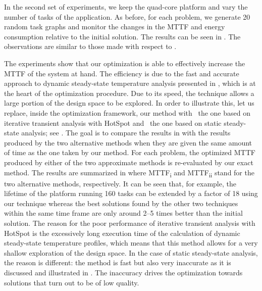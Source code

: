 In the second set of experiments, we keep the quad-core platform and vary the
number of tasks \nt of the application. As before, for each problem, we generate
20 random task graphs and monitor the changes in the \ac{MTTF} and energy
consumption relative to the initial solution. The results can be seen in
. The observations are similar to those made with
respect to .

The experiments show that our optimization is able to effectively increase the
\ac{MTTF} of the system at hand. The efficiency is due to the fast and accurate
approach to dynamic steady-state temperature analysis presented in
, which is at the heart of the optimization
procedure. Due to its speed, the technique allows a large portion of the design
space to be explored. In order to illustrate this, let us replace, inside the
optimization framework, our method with \one~the one based on iterative
transient analysis with HotSpot and \two~the one based on static steady-state
analysis; see . The goal is to compare the
results in  with the results produced by the two
alternative methods when they are given the same amount of time as the one taken
by our method. For each problem, the optimized \ac{MTTF} produced by either of
the two approximate methods is re-evaluated by our exact method. The results are
summarized in  where \ac{MTTF}\textsubscript{i}
and \ac{MTTF}\textsubscript{ii} stand for the two alternative methods,
respectively. It can be seen that, for example, the lifetime of the platform
running 160 tasks can be extended by a factor of 18 using our technique whereas
the best solutions found by the other two techniques within the same time frame
are only around 2--5 times better than the initial solution. The reason for the
poor performance of iterative transient analysis with HotSpot is the excessively
long execution time of the calculation of dynamic steady-state temperature
profiles, which means that this method allows for a very shallow exploration of
the design space. In the case of static steady-state analysis, the reason is
different: the method is fast but also very inaccurate as it is discussed and
illustrated in . The inaccuracy drives the
optimization towards solutions that turn out to be of low quality.


